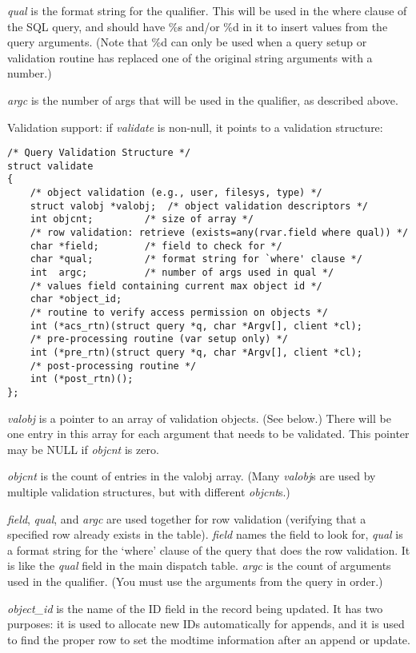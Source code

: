 {\it qual\/} is the format string for the qualifier. This will be used
in the where clause of the SQL query, and should have \%s and/or \%d
in it to insert values from the query arguments. (Note that \%d can
only be used when a query setup or validation routine has replaced one
of the original string arguments with a number.)

{\it argc\/} is the number of args that will be used in the qualifier, as
described above.

Validation support: if {\it validate\/} is non-null, it points to a
validation structure:

\begin{verbatim}
/* Query Validation Structure */
struct validate
{
    /* object validation (e.g., user, filesys, type) */
    struct valobj *valobj;	/* object validation descriptors */
    int objcnt;			/* size of array */
    /* row validation: retrieve (exists=any(rvar.field where qual)) */
    char *field;		/* field to check for */
    char *qual;			/* format string for `where' clause */
    int  argc;			/* number of args used in qual */
    /* values field containing current max object id */
    char *object_id;
    /* routine to verify access permission on objects */
    int (*acs_rtn)(struct query *q, char *Argv[], client *cl);
    /* pre-processing routine (var setup only) */
    int (*pre_rtn)(struct query *q, char *Argv[], client *cl);
    /* post-processing routine */
    int (*post_rtn)();
};
\end{verbatim}

{\it valobj\/} is a pointer to an array of validation objects. (See
below.) There will be one entry in this array for each argument that
needs to be validated. This pointer may be NULL if {\it objcnt\/} is
zero.

{\it objcnt\/} is the count of entries in the valobj array. (Many {\it
valobj\/}s are used by multiple validation structures, but with
different {\it objcnt\/}s.)

{\it field}, {\it qual}, and {\it argc\/} are used together for row
validation (verifying that a specified row already exists in the
table). {\it field\/} names the field to look for, {\it qual\/} is a
format string for the `where' clause of the query that does the row
validation. It is like the {\it qual\/} field in the main dispatch
table. {\it argc\/} is the count of arguments used in the qualifier.
(You must use the arguments from the query in order.)

{\it object\_id\/} is the name of the ID field in the record being updated.
It has two purposes:  it is used to allocate new IDs automatically
for appends, and it is used to find the proper row to set the modtime
information after an append or update.

